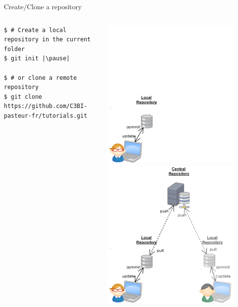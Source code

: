 \begin{frame}[fragile]{Create/Clone a repository}
	\begin{columns}
		\begin{column}{0.6\textwidth}
			\begin{lstlisting}
$ # Create a local repository in the current folder
$ git init |\pause|

$ # or clone a remote repository
$ git clone https://github.com/C3BI-pasteur-fr/tutorials.git
			\end{lstlisting}
		\end{column}
		\begin{column}{0.4\textwidth}
			\begin{center}
				 {
					\includegraphics[width=0.9\textwidth]{init.png}
				}\only<2> {
					\includegraphics[width=0.9\textwidth]{clone.png}
}
\end{center}
\end{column}
\end{columns}
\end{frame}
